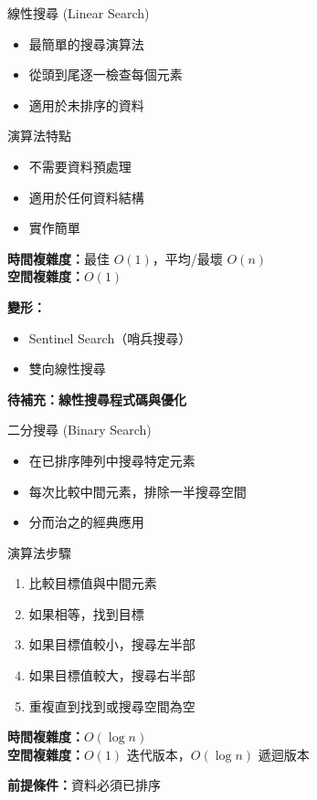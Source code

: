 \documentclass{beamer}
\begin{document}
\begin{frame}{線性搜尋 (Linear Search)}
\begin{itemize}
    \item 最簡單的搜尋演算法
    \item 從頭到尾逐一檢查每個元素
    \item 適用於未排序的資料
\end{itemize}

\vspace{1em}
\begin{block}{演算法特點}
\begin{itemize}
    \item 不需要資料預處理
    \item 適用於任何資料結構
    \item 實作簡單
\end{itemize}
\end{block}

\vspace{1em}
\textbf{時間複雜度：}最佳 $O(1)$，平均/最壞 $O(n)$\\
\textbf{空間複雜度：}$O(1)$

\vspace{1em}
\textbf{變形：}
\begin{itemize}
    \item Sentinel Search（哨兵搜尋）
    \item 雙向線性搜尋
\end{itemize}

\vspace{1em}
\textbf{待補充：線性搜尋程式碼與優化}
\end{frame}

\begin{frame}{二分搜尋 (Binary Search)}
\begin{itemize}
    \item 在已排序陣列中搜尋特定元素
    \item 每次比較中間元素，排除一半搜尋空間
    \item 分而治之的經典應用
\end{itemize}

\vspace{1em}
\begin{block}{演算法步驟}
\begin{enumerate}
    \item 比較目標值與中間元素
    \item 如果相等，找到目標
    \item 如果目標值較小，搜尋左半部
    \item 如果目標值較大，搜尋右半部
    \item 重複直到找到或搜尋空間為空
\end{enumerate}
\end{block}

\vspace{1em}
\textbf{時間複雜度：}$O(\log n)$\\
\textbf{空間複雜度：}$O(1)$ 迭代版本，$O(\log n)$ 遞迴版本

\vspace{1em}
\textbf{前提條件：}資料必須已排序
\end{frame}
\end{document}
